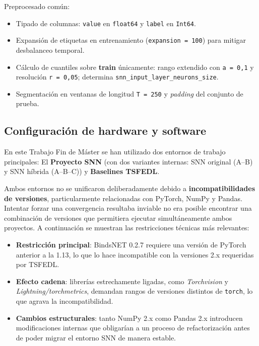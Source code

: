 Preprocesado común:
\begin{itemize}
    \item Tipado de columnas: \texttt{value} en \texttt{float64} y \texttt{label} en \texttt{Int64}.
    \item Expansión de etiquetas en entrenamiento (\texttt{expansion = 100}) para mitigar desbalanceo temporal.
    \item Cálculo de cuantiles sobre \textbf{train} únicamente: rango extendido con \texttt{a = 0{,}1} y resolución \texttt{r = 0{,}05}; determina \texttt{snn\_input\_layer\_neurons\_size}.
    \item Segmentación en ventanas de longitud \texttt{T = 250} y \textit{padding} del conjunto de prueba.
\end{itemize}

\subsection{Configuración de hardware y software}
\label{subsec:config_hw_sw}

En este Trabajo Fin de Máster se han utilizado dos entornos de trabajo principales:  El \textbf{Proyecto SNN} (con dos variantes internas: SNN original (A–B) y SNN híbrida (A–B–C)) y \textbf{Baselines TSFEDL}.

Ambos entornos no se unificaron deliberadamente debido a \textbf{incompatibilidades de versiones}, particularmente relacionadas con PyTorch, NumPy y Pandas. Intentar forzar una convergencia resultaba inviable no era posible encontrar una combinación de versiones que permitiera ejecutar simultáneamente ambos proyectos. A continuación se muestran las restricciones técnicas más relevantes:

\begin{itemize}
    \item \textbf{Restricción principal}: BindsNET 0.2.7 requiere una versión de PyTorch anterior a la 1.13, lo que lo hace incompatible con la versiones 2.x requeridas por TSFEDL.
    \item \textbf{Efecto cadena}: librerías estrechamente ligadas, como \textit{Torchvision} y \textit{Lightning/torchmetrics}, demandan rangos de versiones distintos de \texttt{torch}, lo que agrava la incompatibilidad.
    \item \textbf{Cambios estructurales}: tanto NumPy 2.x como Pandas 2.x introducen modificaciones internas que obligarían a un proceso de refactorización antes de poder migrar el entorno SNN de manera estable.
\end{itemize}

